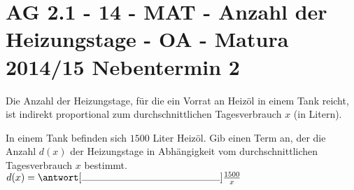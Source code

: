 \section{AG 2.1 - 14 - MAT - Anzahl der Heizungstage - OA - Matura 2014/15 Nebentermin 2}

\begin{beispiel}[AG 2.1]{1} %
				Die Anzahl der Heizungstage, für die ein Vorrat an Heizöl in einem Tank reicht, ist indirekt proportional zum durchschnittlichen Tagesverbrauch $x$ (in Litern).
				
				In einem Tank befinden sich $1500$ Liter Heizöl. Gib einen Term an, der die Anzahl $d(x)$ der Heizungstage in Abhängigkeit vom durchschnittlichen Tagesverbrauch $x$ bestimmt.\\
				
				$d(x)=\antwort[\rule{5cm}{0.3pt}]{\frac{1500}{x}}$
\end{beispiel}